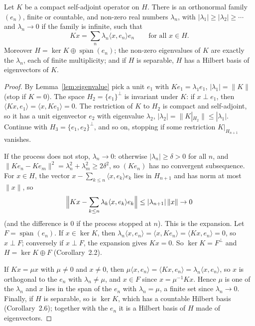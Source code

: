 \begin{theorem}\label{thm:spectralcompact}
Let $K$ be a compact self-adjoint operator on $H$. There is an orthonormal family $(e_n)$, finite or countable, and non-zero real numbers $\lambda_n$, with $|\lambda_1|\ge|\lambda_2|\ge\cdots$ and $\lambda_n\to0$ if the family is
infinite, such that
\[Kx=\sum_n\lambda_n\langle x,e_n\rangle e_n\qquad\text{for all }x\in H.\]
Moreover $H=\ker K\oplus\overline{\operatorname{span}}(e_n)$; the non-zero eigenvalues of $K$ are exactly the $\lambda_n$, each of finite multiplicity; and if $H$ is separable, $H$ has a Hilbert basis of eigenvectors of $K$.
\end{theorem}
\begin{proof}
By Lemma~\ref{lem:eigenvalue} pick a unit $e_1$ with $Ke_1=\lambda_1e_1$, $|\lambda_1|=\|K\|$ (stop if $K=0$). The space $H_2=\{e_1\}^\perp$ is invariant under $K$: if $x\perp e_1$, then $\langle Kx,e_1\rangle=\langle x,Ke_1\rangle=0$. The restriction
of $K$ to $H_2$ is compact and self-adjoint, so it has a unit eigenvector $e_2$ with eigenvalue $\lambda_2$, $|\lambda_2|=\|K|_{H_2}\|\le|\lambda_1|$. Continue with $H_3=\{e_1,e_2\}^\perp$, and so on, stopping if some restriction
$K|_{H_{n+1}}$ vanishes.

If the process does not stop, $\lambda_n\to0$: otherwise $|\lambda_n|\ge\delta>0$ for all $n$, and $\|Ke_n-Ke_m\|^2=\lambda_n^2+\lambda_m^2\ge2\delta^2$, so $(Ke_n)$ has no convergent subsequence. For $x\in H$, the vector
$x-\sum_{k\le n}\langle x,e_k\rangle e_k$ lies in $H_{n+1}$ and has norm at most $\|x\|$, so
\[\Bigl\|Kx-\sum_{k\le n}\lambda_k\langle x,e_k\rangle e_k\Bigr\|\le|\lambda_{n+1}|\,\|x\|\to0\]
(and the difference is $0$ if the process stopped at $n$). This is the expansion. Let $F=\overline{\operatorname{span}}(e_n)$. If $x\in\ker K$, then $\lambda_n\langle x,e_n\rangle=\langle x,Ke_n\rangle=\langle Kx,e_n\rangle=0$, so
$x\perp F$; conversely if $x\perp F$, the expansion gives $Kx=0$. So $\ker K=F^\perp$ and $H=\ker K\oplus F$ (Corollary~2.2).

If $Kx=\mu x$ with $\mu\ne0$ and $x\ne0$, then $\mu\langle x,e_n\rangle=\langle Kx,e_n\rangle=\lambda_n\langle x,e_n\rangle$, so $x$ is orthogonal to the $e_n$ with $\lambda_n\ne\mu$, and $x\in F$ since $x=\mu^{-1}Kx$. Hence $\mu$
is one of the $\lambda_n$ and $x$ lies in the span of the $e_n$ with $\lambda_n=\mu$, a finite set since $\lambda_n\to0$. Finally, if $H$ is separable, so is $\ker K$, which has a countable Hilbert basis (Corollary~2.6); together
with the $e_n$ it is a Hilbert basis of $H$ made of eigenvectors.
\end{proof}

